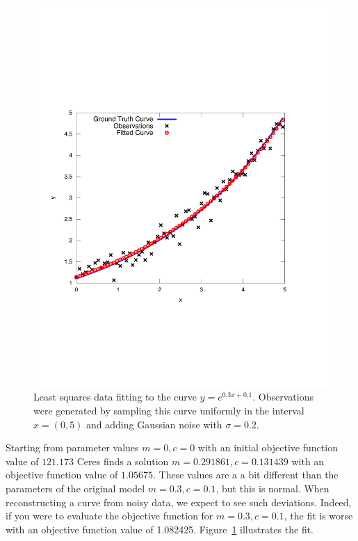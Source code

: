 \begin{figure}[t]
	\begin{center}
	\includegraphics[width=\textwidth]{fit.pdf}
	\caption{Least squares data fitting to the curve $y = e^{0.3x + 0.1}$. Observations were generated by sampling this curve uniformly in the interval $x=(0,5)$ and adding Gaussian noise with $\sigma = 0.2$.\label{fig:exponential}}
\end{center}
\end{figure}

Starting from parameter values $m = 0, c=0$ with an initial objective function value of $121.173$ Ceres finds a solution $m= 0.291861, c = 0.131439$ with an objective function value of $1.05675$. These values are a a bit different than the parameters of the original model $m=0.3, c= 0.1$, but this is normal. When reconstructing a curve from noisy data, we expect to see such deviations. Indeed, if you were to evaluate the objective function for $m=0.3, c=0.1$, the fit is worse with an objective function value of 1.082425. Figure~\ref{fig:exponential} illustrates the fit.

